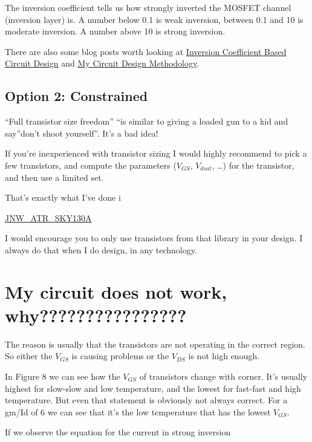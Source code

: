 The inversion coefficient tells us how strongly inverted the MOSFET
channel (inversion layer) is. A number below 0.1 is weak inversion,
between 0.1 and 10 is moderate inversion. A number above 10 is strong
inversion.

There are also some blog posts worth looking at
\href{https://kevinfronczak.com/blog/inversion-coefficient-based-circuit-design}{Inversion
Coefficient Based Circuit Design} and
\href{https://kevinfronczak.com/blog/my-circuit-design-methodology}{My
Circuit Design Methodology}.

\subsection{Option 2: Constrained}\label{option-2-constrained}

``Full transistor size freedom'' ``is similar to giving a loaded gun to
a kid and say''don't shoot yourself''. It's a bad idea!

If you're inexperienced with transistor sizing I would highly recommend
to pick a few transistors, and compute the parameters (\(V_{GS}\),
\(V_{dsat}\), \ldots) for the transistor, and then use a limited set.

That's exactly what I've done i

\href{https://analogicus.github.io/jnw_atr_sky130A/}{JNW\_ATR\_SKY130A}

I would encourage you to only use transistors from that library in your
design. I always do that when I do design, in any technology.

\section{My circuit does not work,
why????????????????}\label{my-circuit-does-not-work-why}

The reason is usually that the transistors are not operating in the
correct region. So either the \(V_{GS}\) is causing problems or the
\(V_{DS}\) is not high enough.

In Figure 8 we can see how the \(V_{GS}\) of transistors change with
corner. It's usually highest for slow-slow and low temperature, and the
lowest for fast-fast and high temperature. But even that statement is
obviously not always correct. For a gm/Id of 6 we can see that it's the
low temperature that has the lowest \(V_{GS}\).

If we observe the equation for the current in strong inversion


